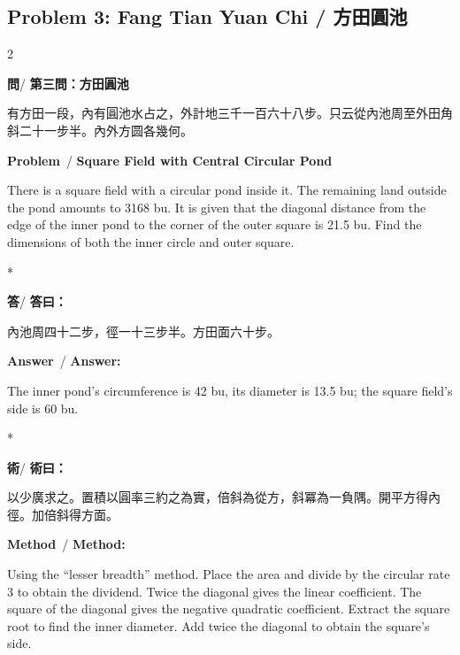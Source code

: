 \documentclass[11pt,a4paper]{article}
\newcommand{\wen}{\textbf{\color{sectioncolor}問}}
\newcommand{\da}{\textbf{\color{answercolor}答}}
\newcommand{\shu}{\textbf{\color{methodcolor}術}}
\newcommand{\prb}{\textbf{\color{sectioncolor}Problem}}
\newcommand{\ans}{\textbf{\color{answercolor}Answer}}
\newcommand{\meth}{\textbf{\color{methodcolor}Method}}
\begin{document}
\vspace{1em}

\subsection*{Problem 3: Fang Tian Yuan Chi / 方田圓池}

\begin{paracol}{2}

\begin{leftcolumn*}
\wen / \textbf{第三問：方田圓池}

有方田一段，內有圓池水占之，外計地三千一百六十八步。只云從內池周至外田角斜二十一步半。內外方圆各幾何。
\end{leftcolumn*}

\begin{rightcolumn}
\prb\ / \textbf{Square Field with Central Circular Pond}

There is a square field with a circular pond inside 
it. The remaining land outside the pond amounts to 3168 bu. It is given 
that the diagonal distance from the edge of the inner pond to the corner 
of the outer square is 21.5 bu. Find the dimensions of both the inner 
circle and outer square.
\end{rightcolumn}

\switchcolumn[0]*

\begin{leftcolumn*}
\da / \textbf{答曰：}

內池周四十二步，徑一十三步半。方田面六十步。
\end{leftcolumn*}

\begin{rightcolumn}
\ans\ / \textbf{Answer:}

The inner pond's circumference is 42 bu, its diameter is 
13.5 bu; the square field's side is 60 bu.
\end{rightcolumn}

\switchcolumn[0]*

\begin{leftcolumn*}
\shu / \textbf{術曰：}

以少廣求之。置積以圓率三約之為實，倍斜為從方，斜冪為一負隅。開平方得內徑。加倍斜得方面。
\end{leftcolumn*}

\begin{rightcolumn}
\meth\ / \textbf{Method:}

Using the ``lesser breadth'' method. Place the area and 
divide by the circular rate 3 to obtain the dividend. Twice the diagonal 
gives the linear coefficient. The square of the diagonal gives the 
negative quadratic coefficient. Extract the square root to find the inner 
diameter. Add twice the diagonal to obtain the square's side.
\end{rightcolumn}

\end{paracol}
\end{document}

